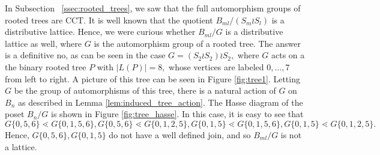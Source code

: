 \documentclass[10 pt]{amsart}
\theoremstyle{plain}
\theoremstyle{definition}
\theoremstyle{remark}
\numberwithin{equation}{section}
\begin{document}
In Subsection ~\ref{ssec:rooted_trees}, we saw that the full automorphism groups of rooted trees are CCT. It is well known that the quotient $B_{ml}/(S_m\wr S_l)$ is a distributive lattice. Hence, we were curious whether $B_{ml}/G$ is a distributive lattice as well, where $G$ is the automorphism group of a rooted tree. The answer is a definitive no, as can be seen in the case $G = (S_2 \wr S_2) \wr S_2,$ where $G$ acts on a the binary rooted tree $P$ with $|L(P)| = 8,$ whose vertices are labeled $0,\ldots, 7$ from left to right. A picture of this tree can be seen in Figure \ref{fig:tree1}. Letting $G$ be the group of automorphisms of this tree, there is a natural action of $G$ on $B_n$ as described in Lemma \ref{lem:induced_tree_action}. The Hasse diagram of the poset $B_n/G$ is shown in Figure \ref{fig:tree_hasse}. In this case, it is easy to see that $G\{0,5,6\} \lessdot G\{0,1,5,6\},G\{0,5,6\} \lessdot G\{0,1,2,5\},G\{0,1,5\} \lessdot G\{0,1,5,6\},G\{0,1,5\} \lessdot G\{0,1,2,5\}.$ Hence, $G\{0,5,6\},G\{0,1,5\}$ do not have a well defined join, and so $B_{ml}/G$ is not a lattice.
\end{document}
